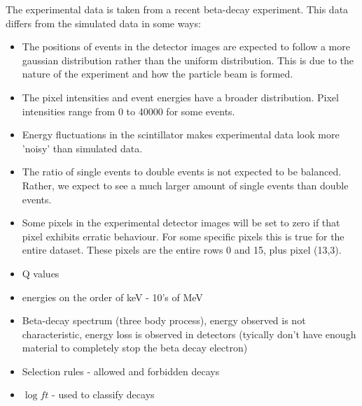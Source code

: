 The experimental data is taken from a recent beta-decay experiment. This data differs
from the simulated data in some ways:
\begin{itemize}
	\item The positions of events in the detector images are expected to follow a more
	gaussian distribution rather than the uniform distribution. This is due to the
	nature of the experiment and how the particle beam is formed.
	\item The pixel intensities and event energies have a broader distribution.
	Pixel intensities range from 0 to 40000 for some events.
	\item Energy fluctuations in the scintillator makes experimental data look more
	'noisy' than simulated data.
	\item The ratio of single events to double events is not expected to be balanced.
	Rather, we expect to see a much larger amount of single events than double events.
	\item Some pixels in the experimental detector images will be set to zero if that
	pixel exhibits erratic behaviour. For some specific pixels this is true for the
	entire dataset. These pixels are the entire rows 0 and 15, plus pixel (13,3).
\end{itemize}

\begin{itemize}
	\item Q values
	\item energies on the order of keV - 10's of MeV
	\item Beta-decay spectrum (three body process), energy observed is not characteristic,
	energy loss is observed in detectors (tyically don't have enough material to completely
	stop the beta decay electron)
	\item Selection rules - allowed and forbidden decays
	\item $\log ft$ - used to classify decays
\end{itemize}

